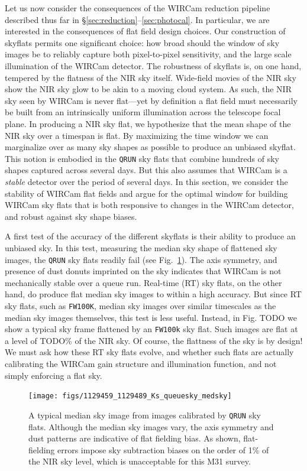 \documentclass[iop]{emulateapj}
\newcommand{\todo}[1]{\textcolor{RedOrange}{#1}} %
\newcommand{\Fig}[1]{Fig.~\ref{fig:#1}}  %
\newcommand{\Sec}[1]{\S\ref{sec:#1}}  %
\begin{document}
Let us now consider the consequences of the WIRCam reduction pipeline described thus far in \Sec{reduction}--\ref{sec:photocal}.
In particular, we are interested in the consequences of flat field design choices.
Our construction of skyflats permits one significant choice: how broad should the window of sky images be to reliably capture both pixel-to-pixel sensitivity, and the large scale illumination of the WIRCam detector.
The robustness of skyflats is, on one hand, tempered by the flatness of the NIR sky itself.
Wide-field movies of the NIR sky \citep{Adams:1996} show the NIR sky glow to be akin to a moving cloud system.
As such, the NIR sky seen by WIRCam is never flat—yet by definition a flat field must necessarily be built from an intrinsically uniform illumination across the telescope focal plane.
In producing a NIR sky flat, we hypothesize that the mean shape of the NIR sky over a timespan is flat.
By maximizing the time window we can marginalize over as many sky shapes as possible to produce an unbiased skyflat.
This notion is embodied in the \texttt{QRUN} sky flats that combine hundreds of sky shapes captured across several days.
But this also assumes that WIRCam is a \emph{stable} detector over the period of several days.
In this section, we consider the stability of WIRCam flat fields and argue for the optimal window for building WIRCam sky flats that is both responsive to changes in the WIRCam detector, and robust against sky shape biases.

A first test of the accuracy of the different skyflats is their ability to produce an unbiased sky.
In this test, measuring the median sky shape of flattened sky images, the \texttt{QRUN} sky flats readily fail (see \Fig{qrun_median_sky}).
The axis symmetry, and presence of dust donuts imprinted on the sky indicates that WIRCam is not mechanically stable over a queue run.
Real-time (RT) sky flats, on the other hand, do produce flat median sky images to within a high accuracy.
But since RT sky flats, such as \texttt{FW100K}, median sky images over similar timescales as the median sky images themselves, this test is less useful.
Instead, in \todo{Fig. TODO} we show a typical sky frame flattened by an \texttt{FW100k} sky flat.
Such images are flat at a level of \todo{TODO}\% of the NIR sky.
Of course, the flattness of the sky is by design! We must ask how these RT sky flats evolve, and whether such flats are actually calibrating the WIRCam gain structure and illumination function, and not simply enforcing a flat sky.

\begin{figure}[t]
\centering
\texttt{[image: figs/1129459\_1129489\_Ks\_queuesky\_medsky]}
\caption{A typical median sky image from images calibrated by \texttt{QRUN} sky flats.
Although the median sky images vary,  the axis symmetry and dust patterns are indicative of flat fielding bias.
As shown, flat-fielding errors impose sky subtraction biases on the order of 1\% of the NIR sky level, which is unacceptable for this M31 survey.}
\label{fig:qrun_median_sky}
\end{figure}
\end{document}
